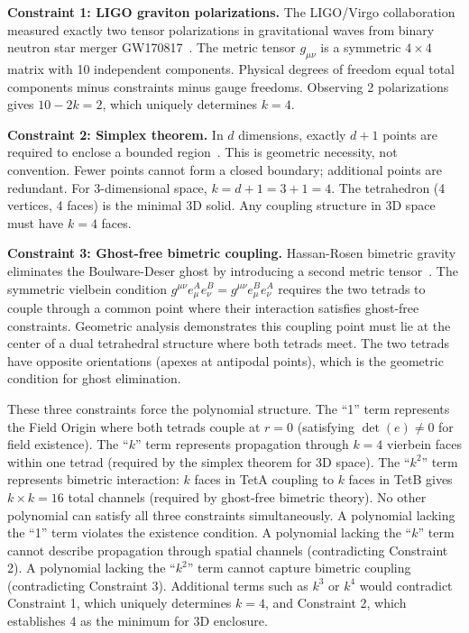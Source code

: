 \documentclass[aps,prd,preprint,superscriptaddress,showpacs,preprintnumbers,amsmath,amssymb,nofootinbib]{revtex4-2}
\begin{document}
\textbf{Constraint 1: LIGO graviton polarizations.}
The LIGO/Virgo collaboration measured exactly two tensor polarizations in gravitational waves from binary neutron star merger GW170817~\cite{gw170817}. The metric tensor $g_{\mu\nu}$ is a symmetric $4 \times 4$ matrix with 10 independent components. Physical degrees of freedom equal total components minus constraints minus gauge freedoms. Observing 2 polarizations gives $10 - 2k = 2$, which uniquely determines $k = 4$.

\textbf{Constraint 2: Simplex theorem.}
In $d$ dimensions, exactly $d+1$ points are required to enclose a bounded region~\cite{coxeter1973}. This is geometric necessity, not convention. Fewer points cannot form a closed boundary; additional points are redundant. For 3-dimensional space, $k = d + 1 = 3 + 1 = 4$. The tetrahedron (4 vertices, 4 faces) is the minimal 3D solid. Any coupling structure in 3D space must have $k = 4$ faces.

\textbf{Constraint 3: Ghost-free bimetric coupling.}
Hassan-Rosen bimetric gravity eliminates the Boulware-Deser ghost by introducing a second metric tensor~\cite{hassan2012}. The symmetric vielbein condition $g^{\mu\nu} e^A_{\mu} e^B_{\nu} = g^{\mu\nu} e^B_{\mu} e^A_{\nu}$ requires the two tetrads to couple through a common point where their interaction satisfies ghost-free constraints. Geometric analysis demonstrates this coupling point must lie at the center of a dual tetrahedral structure where both tetrads meet. The two tetrads have opposite orientations (apexes at antipodal points), which is the geometric condition for ghost elimination.

These three constraints force the polynomial structure. The ``1'' term represents the Field Origin where both tetrads couple at $r = 0$ (satisfying $\det(e) \neq 0$ for field existence). The ``$k$'' term represents propagation through $k = 4$ vierbein faces within one tetrad (required by the simplex theorem for 3D space). The ``$k^2$'' term represents bimetric interaction: $k$ faces in TetA coupling to $k$ faces in TetB gives $k \times k = 16$ total channels (required by ghost-free bimetric theory). No other polynomial can satisfy all three constraints simultaneously. A polynomial lacking the ``1'' term violates the existence condition. A polynomial lacking the ``$k$'' term cannot describe propagation through spatial channels (contradicting Constraint 2). A polynomial lacking the ``$k^2$'' term cannot capture bimetric coupling (contradicting Constraint 3). Additional terms such as $k^3$ or $k^4$ would contradict Constraint 1, which uniquely determines $k = 4$, and Constraint 2, which establishes 4 as the minimum for 3D enclosure.
\end{document}
